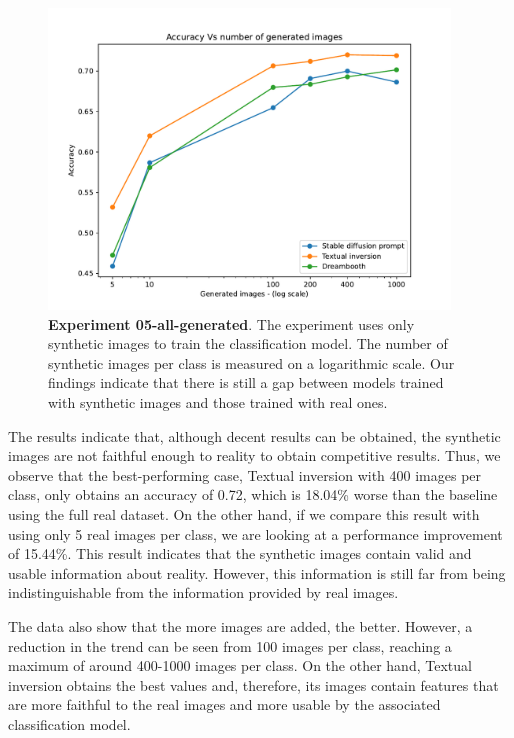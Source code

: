 \begin{figure}[ht]
    \centering
    \includegraphics[width=0.95\textwidth]{Pictures/experiment_005.pdf}
    \caption{\textbf{Experiment 05-all-generated}. The experiment uses only synthetic images to train the classification model. The number of synthetic images per class is measured on a logarithmic scale. Our findings indicate that there is still a gap between models trained with synthetic images and those trained with real ones.}
    \label{fig:exp5}
\end{figure}

The results indicate that, although decent results can be obtained, the synthetic images are not faithful enough to reality to obtain competitive results. Thus, we observe that the best-performing case, Textual inversion with 400 images per class, only obtains an accuracy of 0.72, which is 18.04\% worse than the baseline using the full real dataset. On the other hand, if we compare this result with using only 5 real images per class, we are looking at a performance improvement of 15.44\%. This result indicates that the synthetic images contain valid and usable information about reality. However, this information is still far from being indistinguishable from the information provided by real images.

The data also show that the more images are added, the better. However, a reduction in the trend can be seen from 100 images per class, reaching a maximum of around 400-1000 images per class. On the other hand, Textual inversion obtains the best values and, therefore, its images contain features that are more faithful to the real images and more usable by the associated classification model.

